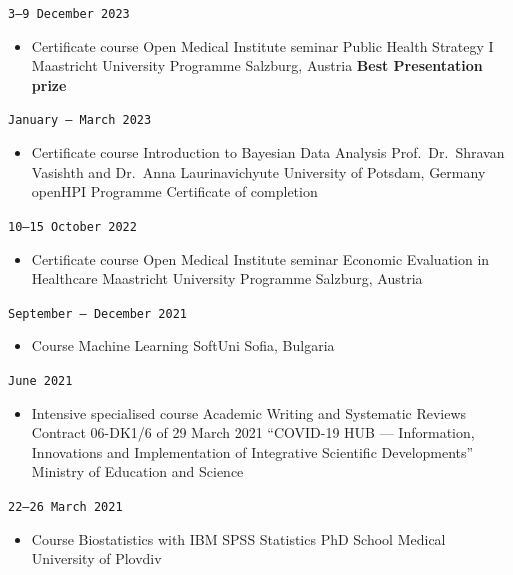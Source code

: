 \documentclass[
  10.5pt,
  a4paper,
  DIV=11,
  numbers=noendperiod]{scrartcl}
\providecommand{\tightlist}{%
  \setlength{\itemsep}{0pt}\setlength{\parskip}{0pt}}
\let\oldtexttt\texttt
\renewcommand{\texttt}[1]{{\color{cvbronze}\small\oldtexttt{#1}}}
\begin{document}
\texttt{3–9\ December\ 2023}

\begin{itemize}
\tightlist
\item
  Certificate course \textbar{} Open Medical Institute seminar
  \textbar{} Public Health Strategy I \textbar{} Maastricht University
  Programme \textbar{} Salzburg, Austria \textbar{} \textbf{Best
  Presentation prize}
\end{itemize}

\texttt{January\ –\ March\ 2023}

\begin{itemize}
\tightlist
\item
  Certificate course \textbar{} Introduction to Bayesian Data Analysis
  \textbar{} Prof.~Dr.~Shravan Vasishth and Dr.~Anna Laurinavichyute
  \textbar{} University of Potsdam, Germany \textbar{} openHPI Programme
  \textbar{} Certificate of completion
\end{itemize}

\texttt{10–15\ October\ 2022}

\begin{itemize}
\tightlist
\item
  Certificate course \textbar{} Open Medical Institute seminar
  \textbar{} Economic Evaluation in Healthcare \textbar{} Maastricht
  University Programme \textbar{} Salzburg, Austria
\end{itemize}

\texttt{September\ –\ December\ 2021}

\begin{itemize}
\tightlist
\item
  Course \textbar{} Machine Learning \textbar{} SoftUni \textbar{}
  Sofia, Bulgaria
\end{itemize}

\texttt{June\ 2021}

\begin{itemize}
\tightlist
\item
  Intensive specialised course \textbar{} Academic Writing and
  Systematic Reviews \textbar{} Contract 06-DK1/6 of 29 March 2021
  \textbar{} ``COVID-19 HUB --- Information, Innovations and
  Implementation of Integrative Scientific Developments'' \textbar{}
  Ministry of Education and Science
\end{itemize}

\texttt{22–26\ March\ 2021}

\begin{itemize}
\tightlist
\item
  Course \textbar{} Biostatistics with IBM SPSS Statistics \textbar{}
  PhD School \textbar{} Medical University of Plovdiv
\end{itemize}
\end{document}
